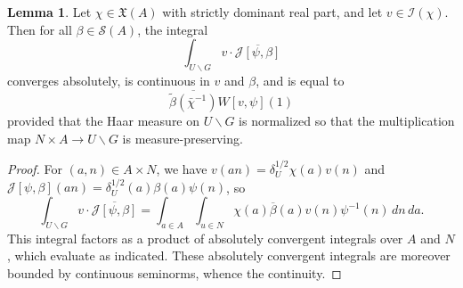 \documentclass[reqno]{amsart}
\theoremstyle{plain} \newtheorem{theorem} {Theorem}
\theoremstyle{definition} \newtheorem{definition} [theorem] {Definition}
\theoremstyle{itplain} %
\newtheorem{lemma}[theorem]{Lemma}
\numberwithin{equation}{section}
\numberwithin{theorem}{section}
\begin{document}
\begin{lemma}\label{lem:scratch-research:let-chi-in-1-v-J}
  Let $\chi \in \mathfrak{X}(A)$ with strictly dominant real part, and let $v \in \mathcal{I}(\chi)$.  Then for all $\beta \in \mathcal{S}(A)$, the integral
  \begin{equation*}
    \int _{U \backslash G} v \cdot \overline{\mathcal{J}[\psi, \beta ]}
  \end{equation*}
  converges absolutely, is continuous in $v$ and $\beta$, and is equal to
  \begin{equation*}
        \overline{\tilde{\beta}(\bar{\chi}^{-1})}
    W[v, \psi](1)
  \end{equation*}
  provided that the Haar measure on $U \backslash G$ is normalized so that the multiplication map $N \times A \rightarrow U \backslash G$ is measure-preserving.
\end{lemma}
\begin{proof}
  For $(a,n) \in A \times N$, we have $v(a n) = \delta_U^{1/2} \chi(a) v(n)$ and $\mathcal{J}[\psi,\beta](a n) = \delta_U^{1/2}(a) \beta(a) \psi(n)$, so
  \begin{equation*}
    \int _{U \backslash G} v \cdot \overline{\mathcal{J}[\psi, \beta ]}
    =
    \int _{a \in A}
    \int _{u \in N}
    \chi(a) \overline{\beta}(a)
    v(n)
    \psi^{-1}(n) \, d n \, d a.
  \end{equation*}
  This integral factors as a product of absolutely convergent integrals over $A$ and $N$, which evaluate as indicated.  These absolutely convergent integrals are moreover bounded by continuous seminorms, whence the continuity.
\end{proof}
\end{document}
